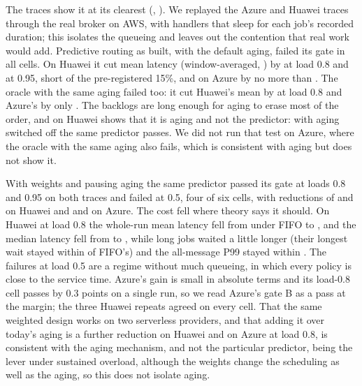 The traces show it at its clearest (, ). We replayed the Azure and Huawei traces through the real broker on AWS, with handlers that sleep for each job's recorded duration; this isolates the queueing and leaves out the contention that real work would add. Predictive routing as built, with the default aging, failed its gate in all \ReplayCells{} cells. On Huawei it cut mean latency (window-averaged, ) by \ReplayHuaweiAEightAbs{} at load 0.8 and \ReplayHuaweiANinetyFiveAbs{} at 0.95, short of the pre-registered 15\%, and on Azure by no more than \ReplayAzureANinetyFiveAbs{}. The oracle with the same aging failed too: it cut Huawei's mean by \ReplayHuaweiOracleEightAbs{} at load 0.8 and Azure's by only \ReplayAzureOracleEightAbs{}. The backlogs are long enough for aging to erase most of the order, and on Huawei  shows that it is aging and not the predictor: with aging switched off the same predictor passes. We did not run that test on Azure, where the oracle with the same aging also fails, which is consistent with aging but does not show it.

With weights and pausing aging the same predictor passed its gate at loads 0.8 and 0.95 on both traces and failed at 0.5, four of six cells, with reductions of \ReplayHuaweiBEightAbs{} and \ReplayHuaweiBNinetyFiveAbs{} on Huawei and \ReplayAzureBEightAbs{} and \ReplayAzureBNinetyFiveAbs{} on Azure. The cost fell where theory says it should. On Huawei at load 0.8 the whole-run mean latency fell from \ReplayHuaweiFifoMeanEight{} under FIFO to \ReplayHuaweiWeightedMeanEight{}, and the median latency fell from \ReplayHuaweiFifoMedianEight{} to \ReplayHuaweiWeightedMedianEight{}, while long jobs waited a little longer (their longest wait stayed within \ReplayHuaweiBLongEight{} of FIFO's) and the all-message P99 stayed within \ReplayHuaweiBPNinetyNineEight{}. The failures at load 0.5 are a regime without much queueing, in which every policy is close to the service time. Azure's gain is small in absolute terms and its load-0.8 cell passes by 0.3 points on a single run, so we read Azure's gate B as a pass at the margin; the three Huawei repeats agreed on every cell. That the same weighted design works on two serverless providers, and that adding it over today's aging is a further \ReplayHuaweiBVsAEightAbs{} reduction on Huawei and \ReplayAzureBVsAEightAbs{} on Azure at load 0.8, is consistent with the aging mechanism, and not the particular predictor, being the lever under sustained overload, although the weights change the scheduling as well as the aging, so this does not isolate aging.

